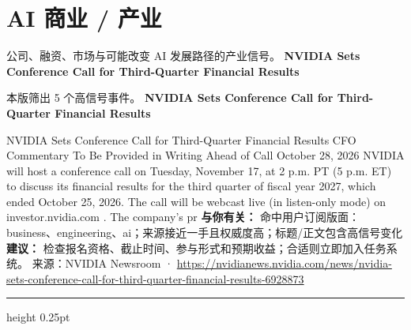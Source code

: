 \documentclass[10.5pt]{ctexart}
\begin{document}
\section*{AI 商业 / 产业}
{\color{ormuted} 公司、融资、市场与可能改变 AI 发展路径的产业信号。}
\vspace{2mm}
{\LARGE\bfseries NVIDIA Sets Conference Call for Third-Quarter Financial Results}\par
\vspace{1mm}
{\color{ormuted} 本版筛出 5 个高信号事件。}
\vspace{3mm}
{\Large\bfseries NVIDIA Sets Conference Call for Third-Quarter Financial Results}\par
NVIDIA Sets Conference Call for Third-Quarter Financial Results CFO Commentary To Be Provided in Writing Ahead of Call October 28, 2026 NVIDIA will host a conference call on Tuesday, November 17, at 2 p.m. PT (5 p.m. ET) to discuss its financial results for the third quarter of fiscal year 2027, which ended October 25, 2026. The call will be webcast live (in listen-only mode) on investor.nvidia.com . The company’s pr
\textbf{与你有关：} 命中用户订阅版面：business、engineering、ai；来源接近一手且权威度高；标题/正文包含高信号变化
\textbf{建议：} 检查报名资格、截止时间、参与形式和预期收益；合适则立即加入任务系统。
{\footnotesize\color{ormuted} 来源：NVIDIA Newsroom · \url{https://nvidianews.nvidia.com/news/nvidia-sets-conference-call-for-third-quarter-financial-results-6928873}}
\vspace{4mm}
\hrule height 0.25pt
\vspace{3mm}
\end{document}
